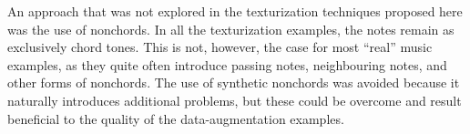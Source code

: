 
An approach that was not explored in the texturization
techniques proposed here was the use of \gls{nonchord}s. In
all the texturization examples, the notes remain as
exclusively chord tones. This is not, however, the case for
most ``real'' music examples, as they quite often introduce
passing notes, neighbouring notes, and other forms of
\gls{nonchord}s. The use of synthetic \gls{nonchord}s was
avoided because it naturally introduces additional problems,
but these could be overcome and result beneficial to the
quality of the data-augmentation examples.
